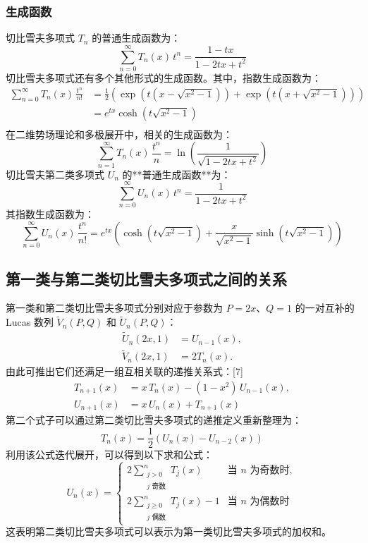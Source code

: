 \subsubsection{生成函数}
切比雪夫多项式 $T_n$ 的普通生成函数为：
$$
\sum_{n=0}^{\infty} T_n(x)\, t^n = \frac{1 - t x}{1 - 2 t x + t^2}~
$$
切比雪夫多项式还有多个其他形式的生成函数。其中，指数生成函数为：
$$
\begin{aligned}
\sum_{n=0}^{\infty} T_n(x)\, \frac{t^n}{n!}
&= \frac{1}{2} \left( \exp\left(t \left(x - \sqrt{x^2 - 1} \right)\right)+ \exp\left(t \left(x + \sqrt{x^2 - 1} \right)\right) \right)\\
&= e^{t x} \cosh\left(t \sqrt{x^2 - 1}\right)\\
\end{aligned}~
$$
在二维势场理论和多极展开中，相关的生成函数为：
$$
\sum_{n=1}^{\infty} T_n(x)\, \frac{t^n}{n}
= \ln \left( \frac{1}{\sqrt{1 - 2 t x + t^2}} \right)~
$$
切比雪夫第二类多项式 $U_n$ 的**普通生成函数**为：
$$
\sum_{n=0}^{\infty} U_n(x)\, t^n = \frac{1}{1 - 2 t x + t^2}~
$$
其指数生成函数为：
$$
\sum_{n=0}^{\infty} U_n(x)\, \frac{t^n}{n!}
= e^{t x} \left( \cosh\left(t \sqrt{x^2 - 1}\right)
+ \frac{x}{\sqrt{x^2 - 1}} \sinh\left(t \sqrt{x^2 - 1}\right) \right)~
$$
\subsection{第一类与第二类切比雪夫多项式之间的关系}
第一类和第二类切比雪夫多项式分别对应于参数为 $P = 2x$、$Q = 1$ 的一对互补的 Lucas 数列 $\tilde{V}_n(P, Q)$ 和 $\tilde{U}_n(P, Q)$：
$$
\begin{aligned}
\tilde{U}_n(2x, 1) &= U_{n-1}(x), \\
\tilde{V}_n(2x, 1) &= 2 T_n(x).
\end{aligned}~
$$
由此可推出它们还满足一组互相关联的递推关系式：[7]
$$
\begin{aligned}
T_{n+1}(x) &= x\, T_n(x) - (1 - x^2)\, U_{n-1}(x), \\
U_{n+1}(x) &= x\, U_n(x) + T_{n+1}(x)
\end{aligned}~
$$
第二个式子可以通过第二类切比雪夫多项式的递推定义重新整理为：
$$
T_n(x) = \frac{1}{2} \left( U_n(x) - U_{n-2}(x) \right)~
$$
利用该公式迭代展开，可以得到以下求和公式：
$$
U_n(x) = 
\begin{cases}
2 \sum\limits_{\substack{j > 0 \\ j \text{ 奇数}}}^{n} T_j(x) & \text{当 } n \text{ 为奇数时}, \\
2 \sum\limits_{\substack{j \geq 0 \\ j \text{ 偶数}}}^{n} T_j(x) - 1 & \text{当 } n \text{ 为偶数时}
\end{cases}~
$$
这表明第二类切比雪夫多项式可以表示为第一类切比雪夫多项式的加权和。

